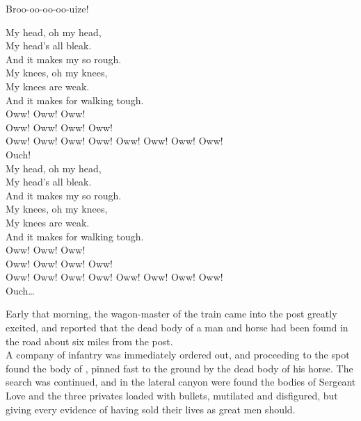 Broo-oo-oo-oo-uize! \\




My head, oh my head, \\
My head's all bleak. \\
And it makes my  so rough. \\

My knees, oh my knees, \\
My knees are weak. \\
And it makes for walking tough. \\

Oww! Oww! Oww! \\
Oww! Oww! Oww! Oww! \\
Oww! Oww! Oww! Oww! Oww! Oww! Oww! Oww! \\
Ouch! \\

My head, oh my head, \\
My head's all bleak. \\
And it makes my  so rough. \\

My knees, oh my knees, \\
My knees are weak. \\
And it makes for walking tough. \\

Oww! Oww! Oww! \\
Oww! Oww! Oww! Oww! \\
Oww! Oww! Oww! Oww! Oww! Oww! Oww! Oww! \\
Ouch… \\





Early that morning, the wagon-master of the train came into the post greatly excited, and reported that the dead body of a man and horse had been found in the road about six miles from the post. \\

A company of infantry was immediately ordered out, and proceeding to the spot found the body of , pinned fast to the ground by the dead body of his horse. The search was continued, and in the lateral canyon were found the bodies of Sergeant Love and the three privates loaded with bullets, mutilated and disfigured, but giving every evidence of having sold their lives as great men should. \\

